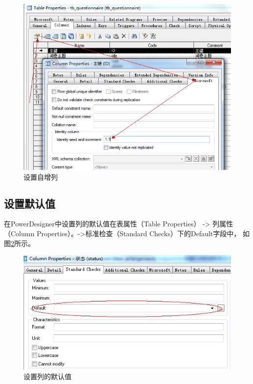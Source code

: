 \documentclass{book}
\begin{document}
\begin{figure}[htbp]
	\centering
	\includegraphics[scale=0.8]{PDSetIdentifyColumn.jpg}
	\caption{设置自增列}
	\label{fig:PDSetIdentifyColumn}
\end{figure}

\subsection{设置默认值}

在PowerDesigner中设置列的默认值在表属性（Table Properties） ->
列属性（Column Properties）。->标准检查（Standard Checks）下的Default字段中，
如图\ref{fig:SetColumnDefaultValue}所示。

\begin{figure}[htbp]
	\centering
	\includegraphics[scale=0.8]{SetColumnDefaultValue.jpg}
	\caption{设置列的默认值}
	\label{fig:SetColumnDefaultValue}
\end{figure}
\end{document}
